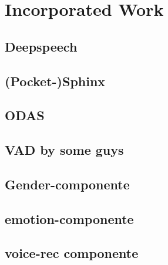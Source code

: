 
\chapter{Incorporated Work}

\section{Deepspeech}

\section{(Pocket-)Sphinx}

\section{ODAS}

\section{VAD by some guys}

\section{Gender-componente}

\section{emotion-componente}

\section{voice-rec componente}